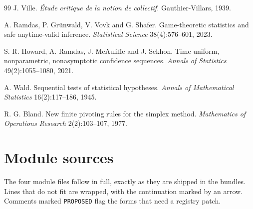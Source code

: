 \documentclass[11pt]{article}
\newcommand{\code}[1]{\texttt{#1}}
\theoremstyle{definition}
\theoremstyle{plain}
\begin{document}
\begin{thebibliography}{99}
 J. Ville. \emph{\'Etude critique de la notion de collectif.} Gauthier-Villars, 1939.

 A. Ramdas, P. Gr\"unwald, V. Vovk and G. Shafer. Game-theoretic statistics and safe
anytime-valid inference. \emph{Statistical Science} 38(4):576--601, 2023.

 S. R. Howard, A. Ramdas, J. McAuliffe and J. Sekhon. Time-uniform, nonparametric,
nonasymptotic confidence sequences. \emph{Annals of Statistics} 49(2):1055--1080, 2021.

 A. Wald. Sequential tests of statistical hypotheses. \emph{Annals of Mathematical
Statistics} 16(2):117--186, 1945.

 R. G. Bland. New finite pivoting rules for the simplex method. \emph{Mathematics of
Operations Research} 2(2):103--107, 1977.

\end{thebibliography}
\clearpage
\appendix
\section{Module sources}\label{app:sources}
The four module files follow in full, exactly as they are shipped in the bundles. Lines that do not fit are wrapped, with the continuation marked by an arrow. Comments marked \code{PROPOSED} flag the forms that need a registry patch.
\end{document}

